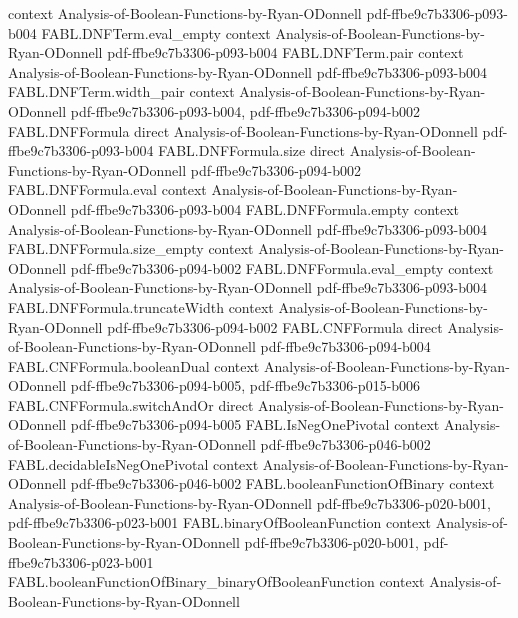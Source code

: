 \begin{theorem}
  {context}
  {Analysis-of-Boolean-Functions-by-Ryan-ODonnell}
  {pdf-ffbe9c7b3306-p093-b004}
\proofstep
  {FABL.DNFTerm.eval_empty}
  {context}
  {Analysis-of-Boolean-Functions-by-Ryan-ODonnell}
  {pdf-ffbe9c7b3306-p093-b004}
\proofstep
  {FABL.DNFTerm.pair}
  {context}
  {Analysis-of-Boolean-Functions-by-Ryan-ODonnell}
  {pdf-ffbe9c7b3306-p093-b004}
\proofstep
  {FABL.DNFTerm.width_pair}
  {context}
  {Analysis-of-Boolean-Functions-by-Ryan-ODonnell}
  {pdf-ffbe9c7b3306-p093-b004,
    pdf-ffbe9c7b3306-p094-b002}
\proofstep
  {FABL.DNFFormula}
  {direct}
  {Analysis-of-Boolean-Functions-by-Ryan-ODonnell}
  {pdf-ffbe9c7b3306-p093-b004}
\proofstep
  {FABL.DNFFormula.size}
  {direct}
  {Analysis-of-Boolean-Functions-by-Ryan-ODonnell}
  {pdf-ffbe9c7b3306-p094-b002}
\proofstep
  {FABL.DNFFormula.eval}
  {context}
  {Analysis-of-Boolean-Functions-by-Ryan-ODonnell}
  {pdf-ffbe9c7b3306-p093-b004}
\proofstep
  {FABL.DNFFormula.empty}
  {context}
  {Analysis-of-Boolean-Functions-by-Ryan-ODonnell}
  {pdf-ffbe9c7b3306-p093-b004}
\proofstep
  {FABL.DNFFormula.size_empty}
  {context}
  {Analysis-of-Boolean-Functions-by-Ryan-ODonnell}
  {pdf-ffbe9c7b3306-p094-b002}
\proofstep
  {FABL.DNFFormula.eval_empty}
  {context}
  {Analysis-of-Boolean-Functions-by-Ryan-ODonnell}
  {pdf-ffbe9c7b3306-p093-b004}
\proofstep
  {FABL.DNFFormula.truncateWidth}
  {context}
  {Analysis-of-Boolean-Functions-by-Ryan-ODonnell}
  {pdf-ffbe9c7b3306-p094-b002}
\proofstep
  {FABL.CNFFormula}
  {direct}
  {Analysis-of-Boolean-Functions-by-Ryan-ODonnell}
  {pdf-ffbe9c7b3306-p094-b004}
\proofstep
  {FABL.CNFFormula.booleanDual}
  {context}
  {Analysis-of-Boolean-Functions-by-Ryan-ODonnell}
  {pdf-ffbe9c7b3306-p094-b005,
    pdf-ffbe9c7b3306-p015-b006}
\proofstep
  {FABL.CNFFormula.switchAndOr}
  {direct}
  {Analysis-of-Boolean-Functions-by-Ryan-ODonnell}
  {pdf-ffbe9c7b3306-p094-b005}
\proofstep
  {FABL.IsNegOnePivotal}
  {context}
  {Analysis-of-Boolean-Functions-by-Ryan-ODonnell}
  {pdf-ffbe9c7b3306-p046-b002}
\proofstep
  {FABL.decidableIsNegOnePivotal}
  {context}
  {Analysis-of-Boolean-Functions-by-Ryan-ODonnell}
  {pdf-ffbe9c7b3306-p046-b002}
\proofstep
  {FABL.booleanFunctionOfBinary}
  {context}
  {Analysis-of-Boolean-Functions-by-Ryan-ODonnell}
  {pdf-ffbe9c7b3306-p020-b001,
    pdf-ffbe9c7b3306-p023-b001}
\proofstep
  {FABL.binaryOfBooleanFunction}
  {context}
  {Analysis-of-Boolean-Functions-by-Ryan-ODonnell}
  {pdf-ffbe9c7b3306-p020-b001,
    pdf-ffbe9c7b3306-p023-b001}
\proofstep
  {FABL.booleanFunctionOfBinary_binaryOfBooleanFunction}
  {context}
  {Analysis-of-Boolean-Functions-by-Ryan-ODonnell}

\end{theorem}
